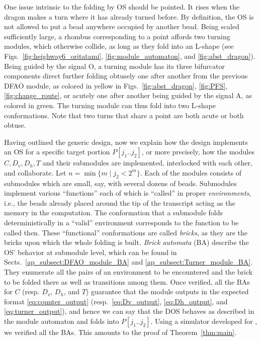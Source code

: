 \documentclass[runningheads]{llncs}
\begin{document}
One issue intrinsic to the folding by OS should be pointed. 
It rises when the dragon makes a turn where it has already turned before. %
By definition, the OS is not allowed to put a bead anywhere occupied by another bead. 
Being scaled sufficiently large, a rhombus corresponding to a point affords two turning modules, which otherwise collide, as long as they fold into an L-shape (see Figs.~\ref{fig:heighway6_oritatami}, \ref{fig:module_automaton}, and \ref{fig:abst_dragon}). 
Being guided by the signal O, a turning module has its three bifurcator components direct further folding obtusely one after another from the previous DFAO module, as colored in yellow in Figs.~\ref{fig:abst_dragon}, \ref{fig:PFS}, \ref{fig:change_route}, or acutely one after another being guided by the signal A, as colored in green. 
The turning module can thus fold into two L-shape conformations. 
Note that two turns that share a point are both acute or both obtuse. 

Having outlined the generic design, now we explain how the design implements an OS for a specific target portion $P[j_1 .. j_2]$, or more precisely, how the modules $C, D_v, D_h, T$ and their submodules are implemented, interlocked with each other, and collaborate. 
Let $n = \min\{m \mid j_2 < 2^m\}$. 
Each of the modules consists of submodules which are small, say, with several dozens of beads. 
Submodules implement various ``functions'' each of which is ``called'' in proper \textit{environments}, i.e., the beads already placed around the tip of the transcript acting as the memory in the computation. 
The conformation that a submodule folds deterministically in a ``valid'' environment corresponds to the function to be called then. 
These ``functional'' conformations are called \textit{bricks}, as they are the bricks upon which the whole folding is built. 
\textit{Brick automata} (BA) describe the OS' behavior at submodule level, which can be found in Sects.~\ref{ap_subsect:DFAO_module_BA} and \ref{ap_subsect:Turner_module_BA}.
They enumerate all the pairs of an environment to be encountered and the brick to be folded there as well as transitions among them. 
Once verified, all the BAs for $C$ (resp. $D_v$, $D_h$, and $T$) guarantee that the module outputs in the expected format \eqref{eq:counter_output} (resp.~\eqref{eq:Dv_output}, \eqref{eq:Dh_output}, and \eqref{eq:turner_output}), and hence we can say that the DOS behaves as described in the module automaton and folds into $P[j_1 .. j_2]$. 
Using a simulator developed for \cite{HaKiOtSe2016}, we verified all the BAs. 
This amounts to the proof of Theorem~\ref{thm:main}. 
\end{document}
